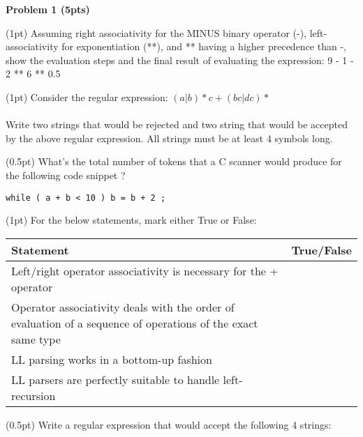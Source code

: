 
\vspace{1cm}

\noindent
{\bf Problem 1 (5pts)}
\vspace{1cm}


\noindent
(1pt) Assuming right associativity for the MINUS binary operator (-), left-associativity for exponentiation (**),
and ** having a higher precedence than -,
show the evaluation steps and the final result of evaluating the expression:  9 - 1 - 2 ** 6 ** 0.5

\vspace{1in}

\noindent
(1pt) Consider the regular expression: $(a|b) * c+ (bc | dc)*$ \\
\\
  Write two strings that would be rejected and two string that would be accepted by the above regular expression.
  All strings must be at least 4 symbols long.


\vspace{1in}

\noindent
(0.5pt)  What's the total number of tokens that a C scanner would produce for the following code snippet ?

\begin{lstlisting}
while ( a + b < 10 ) b = b + 2 ;
\end{lstlisting}

\vspace{1in}

\pagebreak
\noindent
(1pt) For the below statements, mark either True or False:

\vspace{1cm}

\begin{tabular}{|p{13cm}|p{2cm}|}
\hline
{\bf Statement} & {\bf True/False} \\
\hline
Left/right operator associativity is necessary for the + operator &  \\
\hline
Operator associativity deals with the order of evaluation of a sequence of operations of the exact same type	 &  \\
\hline
LL parsing works in a bottom-up fashion  &   \\
\hline
LL parsers are perfectly suitable to handle left-recursion &  \\
\hline
\end{tabular}

\vspace{1cm}

\noindent
(0.5pt) Write a regular expression that would accept the following 4 strings:

